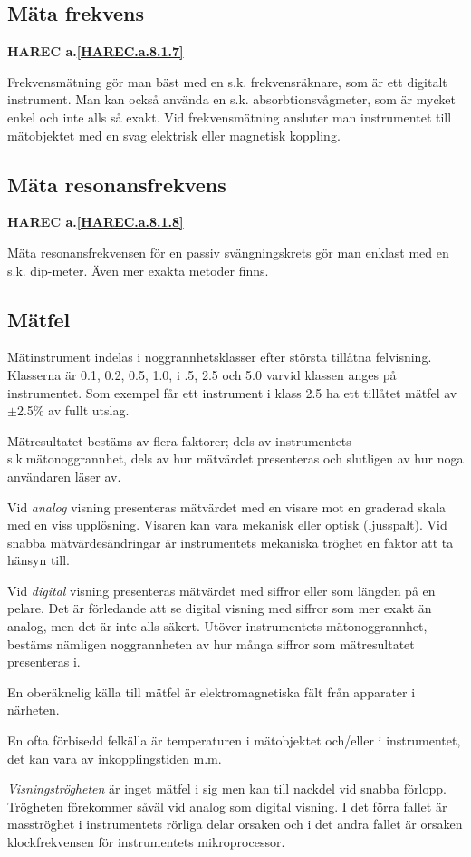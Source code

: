 \subsection{Mäta frekvens}
\textbf{
HAREC a.\ref{HAREC.a.8.1.7}\label{myHAREC.a.8.1.7}
}

Frekvensmätning gör man bäst med en s.k.  frekvensräknare, som är ett
digitalt instrument.  Man kan också använda en
s.k. absorbtionsvågmeter, som är mycket enkel och inte alls så exakt.
Vid frekvensmätning ansluter man instrumentet till mätobjektet med en
svag elektrisk eller magnetisk koppling.

\subsection{Mäta resonansfrekvens}
\textbf{
HAREC a.\ref{HAREC.a.8.1.8}\label{myHAREC.a.8.1.8}
}

Mäta resonansfrekvensen för en passiv svängningskrets gör man enklast
med en s.k. dip-meter. Även mer exakta metoder finns.


\subsection{Mätfel}

Mätinstrument indelas i noggrannhetsklasser efter största tillåtna
felvisning. Klasserna är 0.1, 0.2, 0.5, 1.0, i .5, 2.5 och 5.0 varvid
klassen anges på instrumentet. Som exempel får ett instrument i klass
2.5 ha ett tillåtet mätfel av \(\pm\)2.5\% av fullt utslag.

Mätresultatet bestäms av flera faktorer; dels av instrumentets
s.k.mätonoggrannhet, dels av hur mätvärdet presenteras och slutligen
av hur noga användaren läser av.

Vid \emph{analog} visning presenteras mätvärdet med en visare mot en
graderad skala med en viss upplösning. Visaren kan vara mekanisk eller
optisk (ljusspalt). Vid snabba mätvärdesändringar är instrumentets
mekaniska tröghet en faktor att ta hänsyn till.

Vid \emph{digital} visning presenteras mätvärdet med siffror eller som
längden på en pelare.  Det är förledande att se digital visning med
siffror som mer exakt än analog, men det är inte alls säkert. Utöver
instrumentets mätonoggrannhet, bestäms nämligen noggrannheten av hur
många siffror som mätresultatet presenteras i.

En oberäknelig källa till mätfel är elektromagnetiska fält från
apparater i närheten.

En ofta förbisedd felkälla är temperaturen i mätobjektet och/eller i
instrumentet, det kan vara av inkopplingstiden m.m.

\emph{Visningströgheten} är inget mätfel i sig men kan till nackdel
vid snabba förlopp.  Trögheten förekommer såväl vid analog som digital
visning. I det förra fallet är masströghet i instrumentets rörliga
delar orsaken och i det andra fallet är orsaken klockfrekvensen för
instrumentets mikroprocessor.

